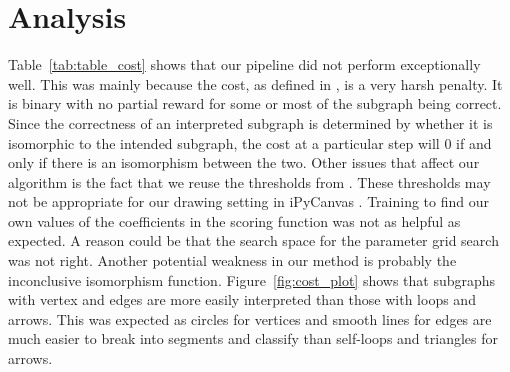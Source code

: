 \section{Analysis}

Table~\ref{tab:table_cost} shows that our pipeline did not perform exceptionally well. This was mainly because the cost, as defined in \cite{daly2015hand}, is a very harsh penalty. It is binary with no partial reward for some or most of the subgraph being correct. Since the correctness of an interpreted subgraph is determined by whether it is isomorphic to the intended subgraph, the cost at a particular step will 0 if and only if there is an isomorphism between the two. Other issues that affect our algorithm is the fact that we reuse the thresholds from \cite{daly2015hand}. These thresholds may not be appropriate for our drawing setting in iPyCanvas \cite{ipycanvas}. Training to find our own values of the coefficients in the scoring function was not as helpful as expected. A reason could be that the search space for the parameter grid search was not right. Another potential weakness in our method is probably the inconclusive isomorphism function. Figure~\ref{fig:cost_plot} shows that subgraphs with vertex and edges are more easily interpreted than those with loops and arrows. This was expected as circles for vertices and smooth lines for edges are much easier to break into segments and classify than self-loops and triangles for arrows.